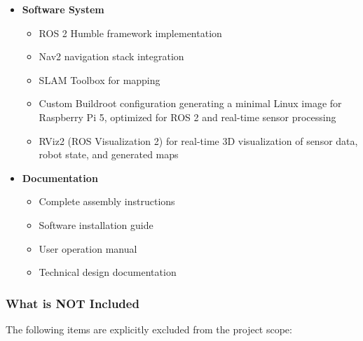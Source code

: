 \begin{itemize}
    \item \textbf{Software System}
    \begin{itemize}
        \item ROS 2 Humble framework implementation
        \item Nav2 navigation stack integration
        \item SLAM Toolbox for mapping
        \item Custom Buildroot configuration generating a minimal Linux image for Raspberry Pi 5, optimized for ROS 2 and real-time sensor processing
        \item RViz2 (ROS Visualization 2) for real-time 3D visualization of sensor data, robot state, and generated maps
    \end{itemize}

    \item \textbf{Documentation}
    \begin{itemize}
        \item Complete assembly instructions
        \item Software installation guide
        \item User operation manual
        \item Technical design documentation
    \end{itemize}
\end{itemize}

\subsubsection{What is NOT Included}

The following items are explicitly excluded from the project scope:

